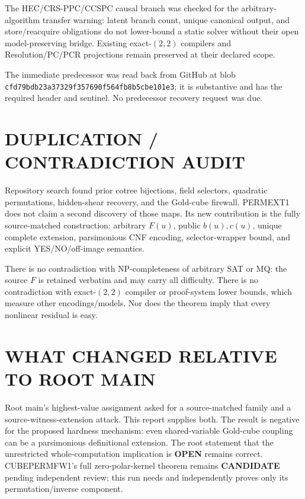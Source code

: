 \documentclass[11pt]{article}
\newcommand{\CAND}{\textbf{CANDIDATE}}
\newcommand{\OPEN}{\textbf{OPEN}}
\begin{document}
The HEC/CRS-PPC/CCSPC causal branch was checked for the arbitrary-algorithm
transfer warning: latent branch count, unique canonical output, and
store/reacquire obligations do not lower-bound a static solver without their
open model-preserving bridge.  Existing exact-$(2,2)$ compilers and
Resolution/PC/PCR projections remain preserved at their declared scope.

The immediate predecessor
was read back from GitHub at blob
\texttt{cfd79bdb23a37329f357690f564fb8b5cbe101e3}; it is substantive and has
the required header and sentinel.  No predecessor recovery request was due.

\section{DUPLICATION / CONTRADICTION AUDIT}
Repository search found prior cotree bijections, field selectors, quadratic
permutations, hidden-shear recovery, and the Gold-cube firewall.  PERMEXT1
does not claim a second discovery of those maps.  Its new contribution is the
fully source-matched construction: arbitrary $F(u)$, public $b(u),c(u)$,
unique complete extension, parsimonious CNF encoding, selector-wrapper bound,
and explicit YES/NO/off-image semantics.

There is no contradiction with NP-completeness of arbitrary SAT or MQ: the
source $F$ is retained verbatim and may carry all difficulty.  There is no
contradiction with exact-$(2,2)$ compiler or proof-system lower bounds, which
measure other encodings/models.  Nor does the theorem imply that every
nonlinear residual is easy.

\section{WHAT CHANGED RELATIVE TO ROOT MAIN}
Root main's highest-value assignment asked for a source-matched family and a
source-witness-extension attack.  This report supplies both.  The result is
negative for the proposed hardness mechanism: even shared-variable Gold-cube
coupling can be a parsimonious definitional extension.  The root statement
that the unrestricted whole-computation implication is \OPEN{} remains
correct.  CUBEPERMFW1's full zero-polar-kernel theorem remains \CAND{} pending
independent review; this run needs and independently proves only its
permutation/inverse component.
\end{document}
